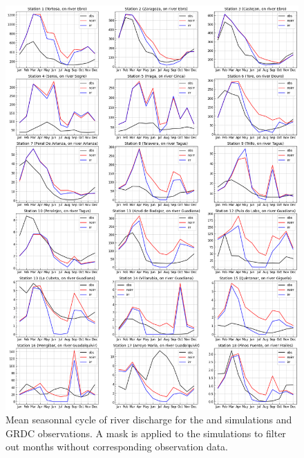 \begin{figure}[htbp]
    \centering
    \includegraphics[width=\textwidth]{images/chap4/article/18_stations_SC.png}
    \caption{Mean seasonnal cycle of river discharge for the \irr and \noirr simulations and GRDC observations. A mask is applied to the simulations to filter out months without corresponding observation data.}
\end{figure}


